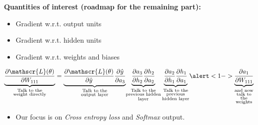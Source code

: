 \savestack{\nnbias}{}
\savestack{\nnweight}{}

\begin{frame}
\end{frame}

\begin{frame}
  \begin{overlayarea}{\textwidth}{\textheight}
    \textbf{Quantities of interest (roadmap for the remaining part):}
    \begin{itemize}
      \justifying
      \item Gradient w.r.t. output units
      \item Gradient w.r.t. hidden units
      \item \alert<1->{Gradient w.r.t. weights and biases}
    \end{itemize}

    \begin{align*}
      \underbrace{\frac{\partial \mathscr{L}(\theta)}{\partial W_{111}}}_
      {\substack{\text{Talk to the}\\ \text{weight directly}}}
      =
      {\underbrace{\frac{\partial \mathscr{L}(\theta)}{\partial \hat{y}} \frac{\partial \hat{y}}{\partial a_{3}}}_
        {\substack{\text{Talk to the} \\ \text{output layer}}}} 
      {\underbrace{\frac{\partial a_{3}}{\partial h_{2}} \frac{\partial h_{2}}{\partial a_{2}}}_
        {\substack{\text{Talk to the} \\ \text{previous hidden} \\ \text{layer}}}
        \underbrace{\frac{\partial a_{2}}{\partial h_{1}} \frac{\partial h_{1}}{\partial a_{1}}}_
        {\substack{\text{Talk to the} \\ \text{previous} \\ \text{hidden layer}}}} 
      \alert<1->{\underbrace{\frac{\partial a_{1}}{\partial W_{111}}}_
        {\substack{\text{and now} \\ \text{talk to} \\ \text{the} \\ \text{weights}}}}
    \end{align*}

    \begin{itemize}
      \justifying
      \item<1-> Our focus is on \textit{Cross entropy loss} and \textit{Softmax} output.
    \end{itemize}
  \end{overlayarea}
\end{frame}

